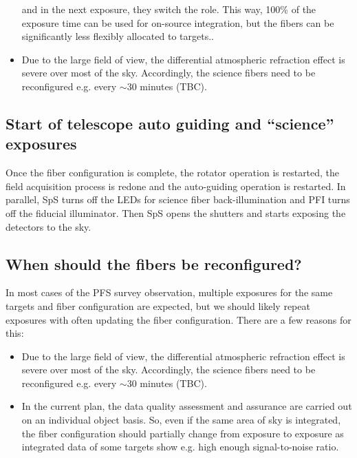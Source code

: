 \documentclass[a4paper]{article}
\begin{document}
\begin{itemize}
{    and in the next exposure, they switch the role. This way, 100\% of
    the exposure time can be used for on-source integration, but the
    fibers can be significantly less flexibly allocated to targets.}.
 \item Due to the large field of view, the differential atmospheric
   refraction effect is severe over most of the sky. Accordingly, the
   science fibers need to be reconfigured e.g. every $\sim$30 minutes
   (TBC).
\end{itemize}

\subsection{Start of telescope auto guiding and ``science'' exposures}

Once the fiber configuration is complete, the rotator operation is
restarted, the field acquisition process is redone and the
auto-guiding operation is restarted. In parallel, SpS turns off the
LEDs for science fiber back-illumination and PFI turns off the
fiducial illuminator. Then SpS opens the shutters and starts exposing
the detectors to the sky.

\subsection{When should the fibers be reconfigured?}

In most cases of the PFS survey observation, multiple exposures for
the same targets and fiber configuration are expected, but we should
likely repeat exposures with often updating the fiber configuration.
There are a few reasons for this:

\begin{itemize}
\item Due to the large field of view, the differential atmospheric
  refraction effect is severe over most of the sky. Accordingly, the
  science fibers need to be reconfigured e.g. every $\sim$30 minutes
  (TBC).
\item In the current plan, the data quality assessment and assurance
  are carried out on an individual object basis. So, even if the same
  area of sky is integrated, the fiber configuration should partially
  change from exposure to exposure as integrated data of some targets
  show e.g. high enough signal-to-noise ratio.
\end{itemize}
\end{document}
